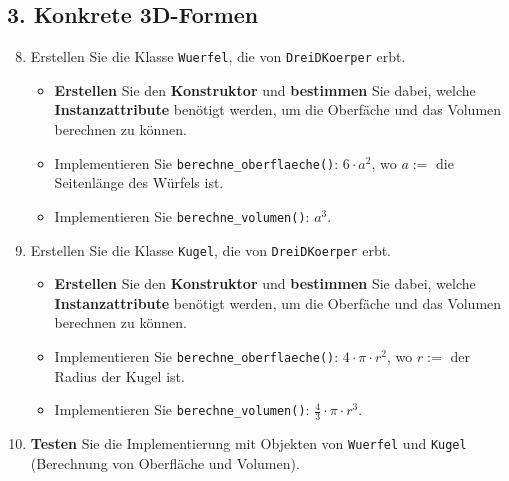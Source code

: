 \begin{myexercise}
    \subsection*{3. Konkrete 3D-Formen}
    \begin{enumerate}
        \setcounter{enumi}{7} 
        \item Erstellen Sie die Klasse \texttt{Wuerfel}, die von \texttt{DreiDKoerper} erbt.
        \begin{itemize}
            \item \textbf{Erstellen} Sie den \textbf{Konstruktor} und \textbf{bestimmen} Sie dabei, welche \textbf{Instanzattribute}  benötigt werden, um die Oberfäche und das Volumen berechnen zu können.
            \item Implementieren Sie \texttt{berechne\_oberflaeche()}: $6 \cdot a^2$, wo $a:=$ die Seitenlänge des Würfels ist.
            \item Implementieren Sie \texttt{berechne\_volumen()}: $a^3$.
        \end{itemize}

        \item Erstellen Sie die Klasse \texttt{Kugel}, die von \texttt{DreiDKoerper} erbt.
        \begin{itemize}
            \item \textbf{Erstellen} Sie den \textbf{Konstruktor} und \textbf{bestimmen} Sie dabei, welche \textbf{Instanzattribute} benötigt werden, um die Oberfäche und das Volumen berechnen zu können.
            \item Implementieren Sie \texttt{berechne\_oberflaeche()}: $4 \cdot \pi \cdot r^2$, wo $r:=$ der Radius der Kugel ist.
            \item Implementieren Sie \texttt{berechne\_volumen()}: $\frac{4}{3} \cdot \pi \cdot r^3$.
        \end{itemize}

        \item \textbf{Testen} Sie die Implementierung mit Objekten von \texttt{Wuerfel} und \texttt{Kugel} (Berechnung von Oberfläche und Volumen).
    \end{enumerate}

\end{myexercise}